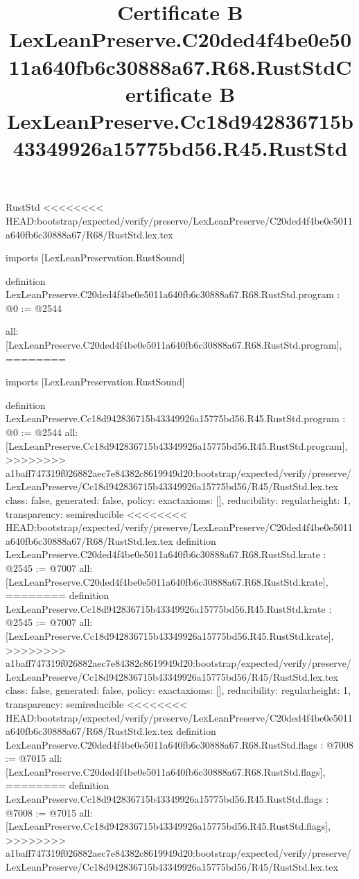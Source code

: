 \begin{lexlean}{RustStd}
<<<<<<<< HEAD:bootstrap/expected/verify/preserve/LexLeanPreserve/C20ded4f4be0e5011a640fb6c30888a67/R68/RustStd.lex.tex
\title{Certificate B LexLeanPreserve.C20ded4f4be0e5011a640fb6c30888a67.R68.RustStd}
\begin{coremodule}
imports [LexLeanPreservation.RustSound]

definition LexLeanPreserve.C20ded4f4be0e5011a640fb6c30888a67.R68.RustStd.program : @0 := @2544 {
  all: [LexLeanPreserve.C20ded4f4be0e5011a640fb6c30888a67.R68.RustStd.program],
========
\title{Certificate B LexLeanPreserve.Cc18d942836715b43349926a15775bd56.R45.RustStd}
\begin{coremodule}
imports [LexLeanPreservation.RustSound]

definition LexLeanPreserve.Cc18d942836715b43349926a15775bd56.R45.RustStd.program : @0 := @2544 {
  all: [LexLeanPreserve.Cc18d942836715b43349926a15775bd56.R45.RustStd.program],
>>>>>>>> a1baff747319f026882aec7e84382c8619949d20:bootstrap/expected/verify/preserve/LexLeanPreserve/Cc18d942836715b43349926a15775bd56/R45/RustStd.lex.tex
  class: false,
  generated: false,
  policy: exact{axioms: []},
  reducibility: regular{height: 1},
  transparency: semireducible
}
<<<<<<<< HEAD:bootstrap/expected/verify/preserve/LexLeanPreserve/C20ded4f4be0e5011a640fb6c30888a67/R68/RustStd.lex.tex
definition LexLeanPreserve.C20ded4f4be0e5011a640fb6c30888a67.R68.RustStd.krate : @2545 := @7007 {
  all: [LexLeanPreserve.C20ded4f4be0e5011a640fb6c30888a67.R68.RustStd.krate],
========
definition LexLeanPreserve.Cc18d942836715b43349926a15775bd56.R45.RustStd.krate : @2545 := @7007 {
  all: [LexLeanPreserve.Cc18d942836715b43349926a15775bd56.R45.RustStd.krate],
>>>>>>>> a1baff747319f026882aec7e84382c8619949d20:bootstrap/expected/verify/preserve/LexLeanPreserve/Cc18d942836715b43349926a15775bd56/R45/RustStd.lex.tex
  class: false,
  generated: false,
  policy: exact{axioms: []},
  reducibility: regular{height: 1},
  transparency: semireducible
}
<<<<<<<< HEAD:bootstrap/expected/verify/preserve/LexLeanPreserve/C20ded4f4be0e5011a640fb6c30888a67/R68/RustStd.lex.tex
definition LexLeanPreserve.C20ded4f4be0e5011a640fb6c30888a67.R68.RustStd.flags : @7008 := @7015 {
  all: [LexLeanPreserve.C20ded4f4be0e5011a640fb6c30888a67.R68.RustStd.flags],
========
definition LexLeanPreserve.Cc18d942836715b43349926a15775bd56.R45.RustStd.flags : @7008 := @7015 {
  all: [LexLeanPreserve.Cc18d942836715b43349926a15775bd56.R45.RustStd.flags],
>>>>>>>> a1baff747319f026882aec7e84382c8619949d20:bootstrap/expected/verify/preserve/LexLeanPreserve/Cc18d942836715b43349926a15775bd56/R45/RustStd.lex.tex
}}}
\end{coremodule}}
\end{coremodule}
\end{lexlean}
